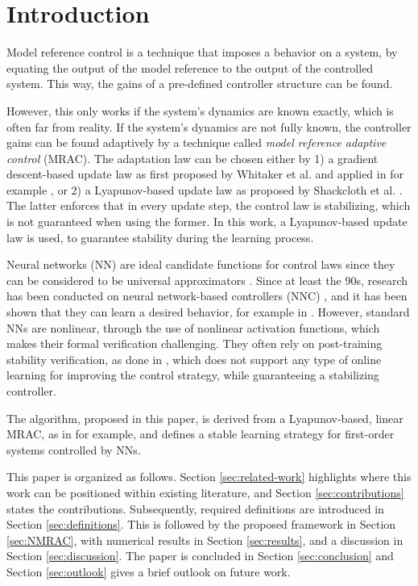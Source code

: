 \section{Introduction}
Model reference control is a technique that imposes a behavior on a system, by equating the output of the model reference to the output of the controlled system. This way, the gains of a pre-defined controller structure can be found. 

However, this only works if the system's dynamics are known exactly, which is often far from reality. If the system's dynamics are not fully known, the controller gains can be found adaptively by a technique called \textit{model reference adaptive control} (MRAC). The adaptation law can be chosen either by 1) a gradient descent-based update law as first proposed by Whitaker et al. \cite{whitaker1959adaptive} and applied in for example \cite{wahby_enhanced_2024, bosshartComparisonTwoPID2021}, or 2) a Lyapunov-based update law as proposed by Shackcloth et al. \cite{shackclothSynthesisModelReference1965}. The latter enforces that in every update step, the control law is stabilizing, which is not guaranteed when using the former. In this work, a Lyapunov-based update law is used, to guarantee stability during the learning process.

Neural networks (NN) are ideal candidate functions for control laws since they can be considered to be universal approximators \cite{hornikUniversalApproximationUnknown1990a}. Since at least the 90s, research has been conducted on neural network-based controllers (NNC) \cite{jiangBriefReviewNeural2017}, and it has been shown that they can learn a desired behavior, for example in \cite{wahby_enhanced_2024, norrisNeuralNetworksControl2021}. However, standard NNs are nonlinear, through the use of nonlinear activation functions, which makes their formal verification challenging. They often rely on post-training stability verification, as done in \cite{kordaStabilityPerformanceVerification2022, revay_convex_2021}, which does not support any type of online learning for improving the control strategy, while guaranteeing a stabilizing controller.

The algorithm, proposed in this paper, is derived from a Lyapunov-based, linear MRAC, as in \cite{lavretskyCombinedCompositeModel2009, slamaModelReferenceAdaptive2018,astromAdaptiveControl2008} for example, and defines a stable learning strategy for first-order systems controlled by NNs.

This paper is organized as follows. Section \ref{sec:related-work} highlights where this work can be positioned within existing literature, and Section \ref{sec:contributions} states the contributions. Subsequently, required definitions are introduced in Section \ref{sec:definitions}. This is followed by the proposed framework in Section \ref{sec:NMRAC}, with numerical results in Section \ref{sec:results}, and a discussion in Section \ref{sec:discussion}. The paper is concluded in Section \ref{sec:conclusion} and Section \ref{sec:outlook} gives a brief outlook on future work.